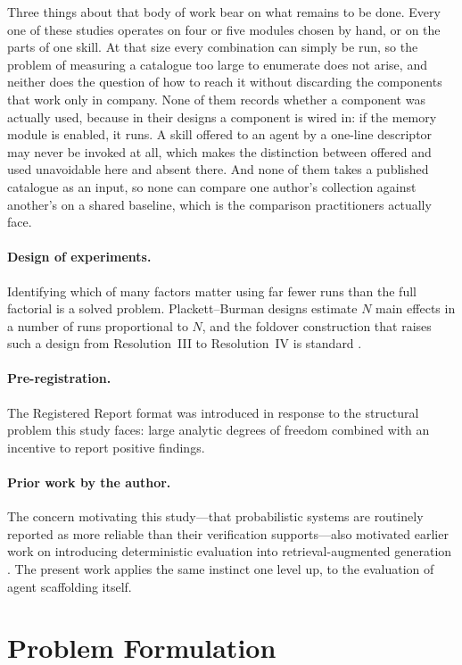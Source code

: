 \documentclass[11pt]{article}
\theoremstyle{plain}
\theoremstyle{definition}
\theoremstyle{remark}
\begin{document}
Three things about that body of work bear on what remains to be done. Every one of these studies operates on four or five modules chosen by hand, or on the parts of one skill. At that size every combination can simply be run, so the problem of measuring a catalogue too large to enumerate does not arise, and neither does the question of how to reach it without discarding the components that work only in company. None of them records whether a component was actually used, because in their designs a component is wired in: if the memory module is enabled, it runs. A skill offered to an agent by a one-line descriptor may never be invoked at all, which makes the distinction between offered and used unavoidable here and absent there. And none of them takes a published catalogue as an input, so none can compare one author's collection against another's on a shared baseline, which is the comparison practitioners actually face.

\paragraph{Design of experiments.} Identifying which of many factors matter using far fewer runs than the full factorial is a solved problem. Plackett--Burman designs \cite{plackett} estimate $N$ main effects in a number of runs proportional to $N$, and the foldover construction that raises such a design from Resolution~III to Resolution~IV is standard \cite{bhh}.

\paragraph{Pre-registration.} The Registered Report format \cite{chambers} was introduced in response to the structural problem this study faces: large analytic degrees of freedom combined with an incentive to report positive findings.

\paragraph{Prior work by the author.} The concern motivating this study---that probabilistic systems are routinely reported as more reliable than their verification supports---also motivated earlier work on introducing deterministic evaluation into retrieval-augmented generation \cite{suro}. The present work applies the same instinct one level up, to the evaluation of agent scaffolding itself.

\section{Problem Formulation}
\end{document}
